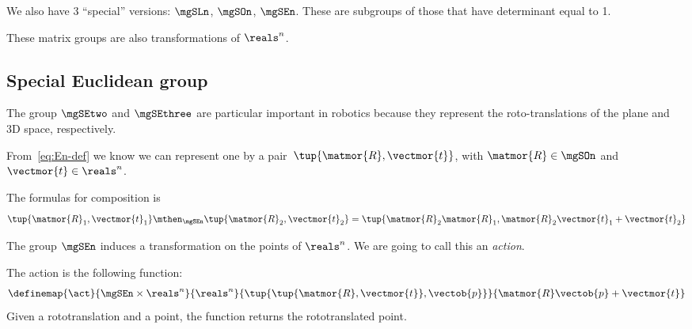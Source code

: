 
We also have 3 ``special'' versions: $\mgSLn$, $\mgSOn$, $\mgSEn$.
These are subgroups of those that have determinant equal to 1.

These matrix groups are also transformations of $\reals^n$.

\subsection{Special Euclidean group}

The group $\mgSEtwo$ and $\mgSEthree$ are particular important in robotics because they represent
the roto-translations of the plane and 3D space, respectively.

From~\cref{eq:En-def} we know we can represent one by a pair~$\tup{\matmor{R}, \vectmor{t}}$, with $\matmor{R}\in\mgSOn$ and
$\vectmor{t} \in \reals^n$.

The formulas for composition is
%
\begin{equation}
  \tup{\matmor{R}_1, \vectmor{t}_1} \mthen_{\mgSEn} \tup{\matmor{R}_2, \vectmor{t}_2}  = \tup{\matmor{R}_2 \matmor{R}_1, \matmor{R}_2 \vectmor{t}_1 + \vectmor{t}_2}
\end{equation}
%

The group $\mgSEn$ induces a transformation on the points of  $\reals^n$.
We are going to call this an \emph{action}.

The action is the following function:
\begin{equation}
\definemap{\act}{\mgSEn \times \reals^n}{\reals^n}{\tup{ \tup{\matmor{R}, \vectmor{t}}, \vectob{p}}}{\matmor{R}\vectob{p} + \vectmor{t}}
\end{equation}
Given a rototranslation and a point, the function returns the rototranslated point.
%

